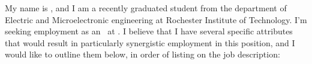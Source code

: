My name is \name, and I am a recently graduated student from the department of Electric and 
Microelectronic engineering at Rochester Institute of Technology. I'm seeking employment 
as an \targetpos\ at \company. I believe that I have several specific 
attributes that would result in particularly synergistic employment in 
this position, and I would like to outline them below, in order of 
listing on the job description: